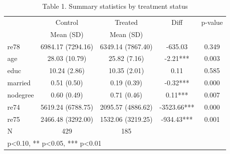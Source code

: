 \begin{table}[htbp]
\centering
\caption{Table 1. Summary statistics by treatment status}
\begin{tabular}{lcccc}
\hline\hline
 & Control & Treated & Diff & p-value \\
 & Mean (SD) & Mean (SD) & & \\
\hline
re78 & 6984.17 (7294.16) & 6349.14 (7867.40) & -635.03 & 0.349 \\
age & 28.03 (10.79) & 25.82 (7.16) & -2.21*** & 0.003 \\
educ & 10.24 (2.86) & 10.35 (2.01) & 0.11 & 0.585 \\
married & 0.51 (0.50) & 0.19 (0.39) & -0.32*** & 0.000 \\
nodegree & 0.60 (0.49) & 0.71 (0.46) & 0.11*** & 0.007 \\
re74 & 5619.24 (6788.75) & 2095.57 (4886.62) & -3523.66*** & 0.000 \\
re75 & 2466.48 (3292.00) & 1532.06 (3219.25) & -934.43*** & 0.001 \\
\hline
N & 429 & 185 & & \\
\hline\hline
\multicolumn{5}{l}{\footnotesize * p<0.10, ** p<0.05, *** p<0.01} \\
\end{tabular}
\end{table}